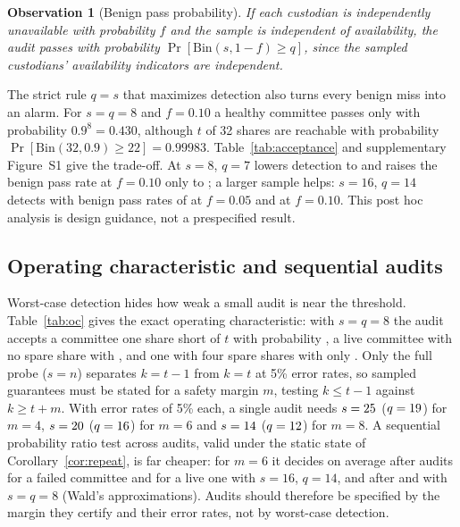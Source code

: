 \documentclass[Crown,sagev]{sagej}
\theoremstyle{plain}
\newtheorem{observation}{Observation}
\theoremstyle{definition}
\theoremstyle{remark}
\begin{document}
\begin{observation}[Benign pass probability]\label{prop:benign}
If each custodian is independently unavailable with probability $f$ and the sample is independent of availability, the audit passes with probability $\Pr[\mathrm{Bin}(s,1-f)\ge q]$, since the sampled custodians' availability indicators are independent.
\end{observation}

The strict rule $q=s$ that maximizes detection also turns every benign miss into an alarm. For $s=q=8$ and $f=0.10$ a healthy committee passes only with probability $0.9^{8}=0.430$, although $t$ of 32 shares are reachable with probability $\Pr[\mathrm{Bin}(32,0.9)\ge 22]=0.99983$. Table~\ref{tab:acceptance} and supplementary Figure~S1 give the trade-off. At $s=8$, $q=7$ lowers detection to \RAccEightSevenDet{} and raises the benign pass rate at $f=0.10$ only to \RAccEightSevenPass{}; a larger sample helps: $s=16$, $q=14$ detects \RAccSixteenFourteenDet{} with benign pass rates of \RAccSixteenFourteenPassFive{} at $f=0.05$ and \RAccSixteenFourteenPassTen{} at $f=0.10$. This post hoc analysis is design guidance, not a prespecified result.

\begin{table}[t]
\caption{Exact acceptance-rule trade-off at $n=32$, $t=22$: worst-case detection ($k=t-1$, Theorem~\ref{thm:fa}) versus the probability that a healthy committee passes under IID unavailability $f$ (Observation~\ref{prop:benign}). Post hoc analysis.}
\label{tab:acceptance}
\centering
\small

\end{table}

\subsection{Operating characteristic and sequential audits}\label{sec:oc}

Worst-case detection hides how weak a small audit is near the threshold. Table~\ref{tab:oc} gives the exact operating characteristic: with $s=q=8$ the audit accepts a committee one share short of $t$ with probability \OcEightTwentyOne{}, a live committee with no spare share with \OcEightTwentyTwo{}, and one with four spare shares with only \OcEightTwentySix{}. Only the full probe ($s=n$) separates $k=t-1$ from $k=t$ at 5\% error rates, so sampled guarantees must be stated for a safety margin $m$, testing $k\le t-1$ against $k\ge t+m$. With error rates of 5\% each, a single audit needs $s=25$ ($q=19$) for $m=4$, $s=20$ ($q=16$) for $m=6$ and $s=14$ ($q=12$) for $m=8$. A sequential probability ratio test across audits\cite{wald1945sprt}, valid under the static state of Corollary~\ref{cor:repeat}, is far cheaper: for $m=6$ it decides on average after \AsnSixteenDead{} audits for a failed committee and \AsnSixteenLive{} for a live one with $s=16$, $q=14$, and after \AsnEightDead{} and \AsnEightLive{} with $s=q=8$ (Wald's approximations). Audits should therefore be specified by the margin they certify and their error rates, not by worst-case detection.
\end{document}
